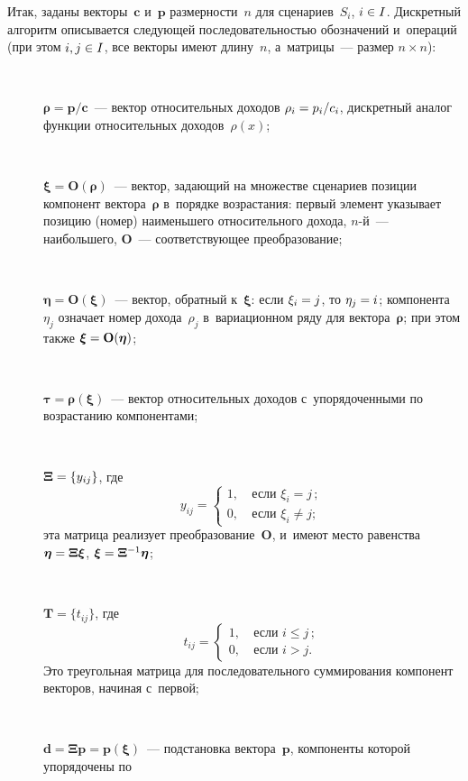 \begin{multicols}{2}
  Итак, заданы векторы~$\mathbf{c}$ и~$\mathbf{p}$ размерности~$n$ для 
сценариев~$S_i$, $i\hm\in I$. Дискретный алгоритм описывается следующей 
последовательностью обозначений и~операций (при этом $i, j\hm\in I$, все 
векторы имеют длину~$n$, а~матрицы~---  размер $n\times n$): 
  \begin{description}
  \item[\,] $\boldsymbol{\rho}=\mathbf{p}/\mathbf{c}$~--- вектор относительных 
доходов $\rho_i\hm=p_i/c_i$, дискретный аналог функции относительных 
доходов~$\rho(x)$;
  \item[\,] $\boldsymbol{\xi}=\mathbf{O}(\boldsymbol{\rho})$~--- вектор, 
задающий на множестве сценариев позиции компонент 
вектора~$\boldsymbol{\rho}$ в~порядке возрастания: первый элемент указывает 
позицию (номер) наименьшего относительного дохода, $n$-й~--- 
наибольшего, $\mathbf{O}$~--- со\-от\-вет\-ст\-ву\-ющее преобразование; 
  \item[\,] $\boldsymbol{\eta}= \mathbf{O}(\boldsymbol{\xi})$~--- вектор, 
обратный к~$\boldsymbol{\xi}$: если $\xi_i\hm=j$, то $\eta_{j}\hm=i$; 
компонента~$\eta_j$ означает номер дохода~$\rho_j$ в~вариационном ряду для 
вектора~$\boldsymbol{\rho}$; при этом также 
$\boldsymbol{\xi}\hm=\mathbf{O}(\boldsymbol{\eta})$; 
  \item[\,] $\boldsymbol{\tau} =\boldsymbol{\rho}(\boldsymbol{\xi})$~--- вектор 
относительных доходов с~упорядоченными по возрастанию компонентами; 
  \item[\,] $\boldsymbol{\Xi}\hm=\{y_{ij}\}$, где 
  $$
  y_{ij}=
  \begin{cases}
  1, &\ \mbox{если } \xi_i=j\,;\\ 
0, &\ \mbox{если } \xi_i\not=j;
\end{cases}
$$
эта матрица реализует 
преобразование~$\mathbf{O}$, и~име\-ют место равенства 
$\boldsymbol{\eta}\hm=\boldsymbol{\Xi}\boldsymbol{\xi}$, 
$\boldsymbol{\xi}\hm= \boldsymbol{\Xi}^{-1}\boldsymbol{\eta}$; 
  \item[\,] $\mathbf{T} = \{t_{ij}\}$, где
  $$
  t_{ij}=\begin{cases}
  1, &\ \mbox{если } i\leq j\,;\\
  0, &\ \mbox{если } i>  j.
  \end{cases}
  $$ 
  Это треугольная матрица для последовательного суммирования компонент 
векторов, начиная с~первой; 
  \item[\,] 
$\mathbf{d}=\boldsymbol{\Xi}\mathbf{p}=\mathbf{p}(\boldsymbol{\xi})$~--- 
подстановка вектора~$\mathbf{p}$, компоненты которой упорядочены по 

\end{description}
\end{multicols}

